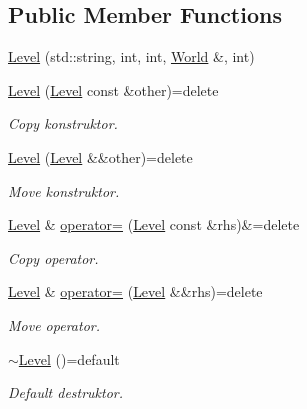 \subsection*{Public Member Functions}
\begin{DoxyCompactItemize}
\item 
\hyperlink{classLevel_a9c1885f00f43c9b88eed9d103dd87408}{Level} (std\+::string, int, int, \hyperlink{classWorld}{World} \&, int)
\item 
\hyperlink{classLevel_acaeb0c9b638c74795b6608635af5b338}{Level} (\hyperlink{classLevel}{Level} const \&other)=delete
\begin{DoxyCompactList}\small\item\em Copy konstruktor. \end{DoxyCompactList}\item 
\hyperlink{classLevel_a5535d562f2ec6c4e08b65fa216933127}{Level} (\hyperlink{classLevel}{Level} \&\&other)=delete
\begin{DoxyCompactList}\small\item\em Move konstruktor. \end{DoxyCompactList}\item 
\hyperlink{classLevel}{Level} \& \hyperlink{classLevel_a182dd33b1b7821359aee3600351d4778}{operator=} (\hyperlink{classLevel}{Level} const \&rhs)\&=delete
\begin{DoxyCompactList}\small\item\em Copy operator. \end{DoxyCompactList}\item 
\hyperlink{classLevel}{Level} \& \hyperlink{classLevel_a89cfea51f0b0f91bbd1e33839c9dc211}{operator=} (\hyperlink{classLevel}{Level} \&\&rhs)=delete
\begin{DoxyCompactList}\small\item\em Move operator. \end{DoxyCompactList}\item 
\hyperlink{classLevel_ac6cdb61bec67832b3db9e5874b479c0d}{$\sim$\+Level} ()=default
\begin{DoxyCompactList}\small\item\em Default destruktor. \end{DoxyCompactList}\end{DoxyCompactItemize}

